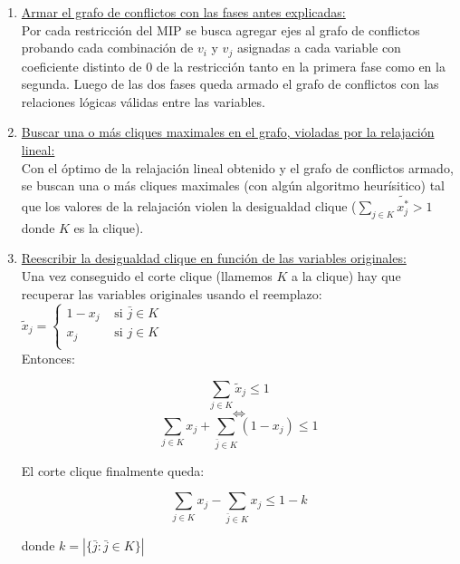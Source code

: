 \begin{enumerate}[ 1{)} ]
\item \underline{Armar el grafo de conflictos con las fases antes explicadas:}\\

Por cada restricci\'on del MIP se busca agregar ejes al grafo de conflictos probando cada combinaci\'on de $v_i$ y $v_j$ asignadas a cada variable con coeficiente distinto de 0 de la restricci\'on tanto en la primera fase como en la segunda. Luego de las dos fases queda armado el grafo de conflictos con las relaciones l\'ogicas v\'alidas entre las variables.

\item \underline{Buscar una o m\'as cliques maximales en el grafo, violadas por la relajaci\'on lineal:}\\

Con el óptimo de la relajaci\'on lineal obtenido y el grafo de conflictos armado, se buscan una o m\'as cliques maximales (con algún algoritmo heurísitico) tal que los valores de la relajaci\'on violen la desigualdad clique ($\sum_{j\in K}\tilde{x^*_j} > 1$ donde $K$ es la clique).

\item \underline{Reescribir la desigualdad clique en función de las variables originales:}\\

Una vez conseguido el corte clique (llamemos $K$ a la clique) hay que recuperar las variables originales usando el reemplazo:
$\tilde{x}_j = 
\begin{cases}
1-x_j & \text{ si } \bar{j}\in K\\
x_j & \text{ si } j\in K\\
\end{cases}$\\

Entonces:

$$\sum_{j\in K}\tilde{x}_j \leq 1$$
$$\Longleftrightarrow$$
$$\sum_{j\in K}x_j + \sum_{\bar{j}\in K}(1-x_j) \leq 1$$

El corte clique finalmente queda:

$$\sum_{j\in K}x_j - \sum_{\bar{j}\in K}x_j \leq 1 - k$$

donde $k = |\{\bar{j} : \bar{j}\in K\}|$

\end{enumerate}
